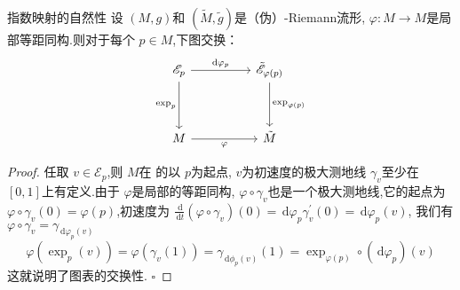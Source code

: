 \documentclass[../../几何与拓扑.tex]{subfiles}
\begin{document}
\begin{proposition}{指数映射的自然性}   
    设 \(  \left( M,g \right)   \)和 \(  \left( \tilde{M},\tilde{g}  \right)   \)是（伪）-Riemann流形, \(   \varphi : M\to M  \)是局部等距同构.则对于每个 \(  p \in M  \),下图交换： \[\begin{tikzcd}
	{ \mathscr{E}_{p}} && { \tilde{\mathscr{E}}_{ \varphi \left( p \right) } } \\
	\\
	M && {\tilde{M}}
	\arrow["{\mathrm{d}  \varphi _{p} }", from=1-1, to=1-3]
	\arrow["{\exp _{p}}"', from=1-1, to=3-1]
	\arrow["{  \exp _{ \varphi \left( p \right) } }", from=1-3, to=3-3]
	\arrow["\varphi"', from=3-1, to=3-3]
\end{tikzcd}\]  
\end{proposition}
\begin{proof}
    任取 \(  v \in \mathscr{E}_{p}  \),则 \(  M  \)在 的以 \(  p  \)为起点, \(  v  \)为初速度的极大测地线 \(   \gamma _{v}  \)至少在 \(  \left[ 0,1 \right]   \)上有定义.由于 \(   \varphi   \)是局部的等距同构, \(   \varphi \circ  \gamma _{v}  \)也是一个极大测地线,它的起点为 \(   \varphi \circ  \gamma _{v}\left( 0 \right)=  \varphi \left( p \right)    \),初速度为 \(  \frac{\,\mathrm{d}  }{\,\mathrm{d} t }\left(  \varphi \circ  \gamma _{v} \right)\left( 0 \right)= \,\mathrm{d}  \varphi _{p}  \gamma _{v}^{\prime} \left( 0 \right)= \,\mathrm{d}  \varphi _{p}\left( v \right)       \),  我们有 \(   \varphi \circ  \gamma _{v}=  \gamma _{ \,\mathrm{d}  \varphi _{p}\left( v \right)}   \)        \[
     \varphi \left( \exp _{p}\left( v \right)  \right)=  \varphi \left(  \gamma _{v}\left( 1 \right)  \right)=  \gamma _{\,\mathrm{d} \phi _{p}\left( v \right) }\left( 1 \right)= \exp _{ \varphi \left( p \right) }\circ \left( \,\mathrm{d}  \varphi _{p} \right)\left( v \right)   
    \]这就说明了图表的交换性.
    \hfill $\square$
\end{proof}
\end{document}
